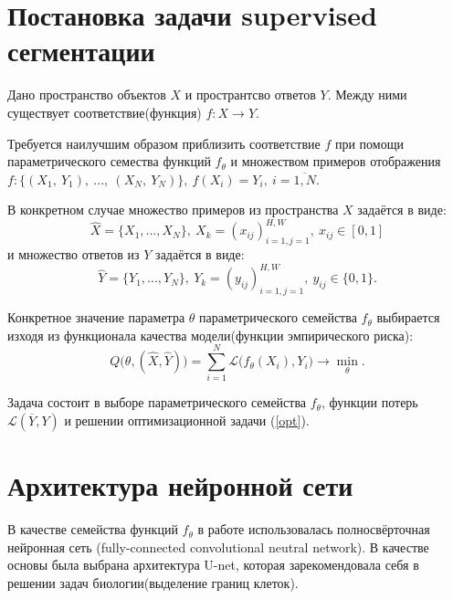 \documentclass[14pt, a4paper, oneside, bold]{extarticle}
\begin{document}
\newpage


\section{Постановка задачи supervised сегментации} \label{seg_supervised}


Дано пространство объектов $X$ и пространтсво ответов $Y$. Между ними существует соответствие(функция) $f: X \rightarrow Y$. 

Требуется наилучшим образом приблизить соответствие $f$ при помощи 
параметрического семества функций $f_{\theta}$ и множеством примеров отображения $f: \{(X_1,\ Y_1),\ ... ,\ (X_N,\ Y_N) \}
	,\ f(X_i) = Y_i ,\ i = \overline{1, N}$.

В конкретном случае множество примеров из пространства $X$ задаётся в виде:
\begin{equation}
	\hat{X} = \{ X_1, ..., X_N \},\ X_k = (x_{ij})_{i=1, j=1}^{H, W}
                       	   ,\ x_{ij} \in [0, 1]
\end{equation}
и множество ответов из $Y$ задаётся в виде:
\begin{equation}
	\hat{Y} = \{ Y_1, ... , Y_N \},\ Y_k = (y_{ij})_{i=1, j=1}^{H, W}
							,\ y_{ij} \in \{ 0, 1 \}.
\end{equation} 

Конкретное значение параметра $\theta$ параметрического семейства $f_{\theta}$ выбирается изходя из функционала качества модели(функции эмпирического риска):
\begin{equation}\label{opt}
	Q \bigl( \theta, (\hat{X}, \hat{Y}) \bigr) = 
		\sum \limits_{i=1}^{N} \mathcal{L} 
		\bigl( f_{\theta}(X_i), Y_i \bigr)
		\longrightarrow \min \limits_{\theta}.
\end{equation}

Задача состоит в выборе параметрического семейства $f_\theta$, 
функции потерь $\mathcal{L}(\overline{Y}, Y)$ и решении 
оптимизационной задачи (\ref{opt}).

\newpage


\section{Архитектура нейронной сети} \label{seg_nn}

В качестве семейства функций $f_{\theta}$ в работе использовалась 
полносвёрточная нейронная сеть (fully-connected convolutional neutral network). В качестве основы была выбрана архитектура U-net, которая зарекомендовала себя в решении задач биологии(выделение границ клеток). 
\end{document}
